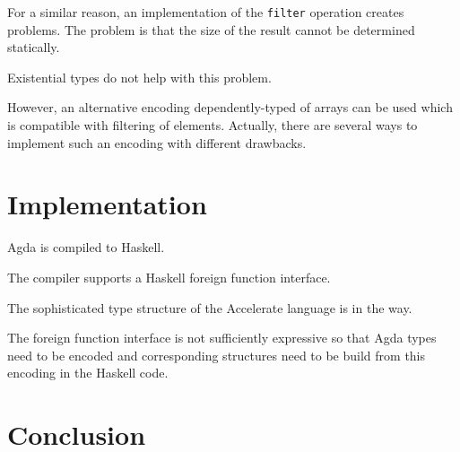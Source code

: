 \documentclass{llncs}
\begin{document}
For a similar reason, an implementation of the \texttt{filter}
operation creates problems. The problem is that the size of the result
cannot be determined statically. 

Existential types do not help with this problem.

However, an alternative encoding dependently-typed of arrays can be
used which is compatible with filtering of elements. Actually, there
are several ways to implement such an encoding with different drawbacks.

\section{Implementation}
\label{sec:implementation}

Agda is compiled to Haskell.

The compiler supports a Haskell foreign function interface. 

The sophisticated type structure of the Accelerate language is in the
way.

The foreign function interface is not sufficiently expressive so that
Agda types need to be encoded and corresponding structures need to be
build from this encoding in the Haskell code. 

\section{Conclusion}
\label{sec:conclusion}


%
%


\end{document}
